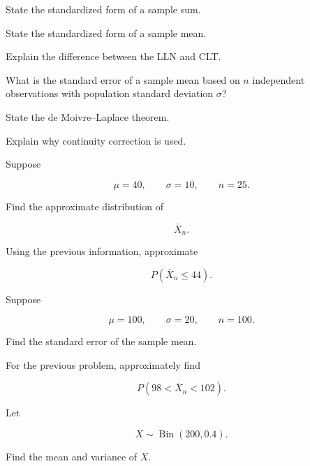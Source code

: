 \begin{exercise}[1]
State the standardized form of a sample sum.
\end{exercise}

\begin{exercise}[1]
State the standardized form of a sample mean.
\end{exercise}

\begin{exercise}[1]
Explain the difference between the LLN and CLT.
\end{exercise}

\begin{exercise}[1]
What is the standard error of a sample mean based on \(n\) independent
observations with population standard deviation \(\sigma\)?
\end{exercise}

\begin{exercise}[1]
State the de Moivre--Laplace theorem.
\end{exercise}

\begin{exercise}[1]
Explain why continuity correction is used.
\end{exercise}

\begin{exercise}[2]
Suppose

\[
\mu=40,
\qquad
\sigma=10,
\qquad
n=25.
\]

Find the approximate distribution of

\[
\overline{X}_n.
\]
\end{exercise}

\begin{exercise}[2]
Using the previous information, approximate

\[
P(\overline{X}_n\leq44).
\]
\end{exercise}

\begin{exercise}[2]
Suppose

\[
\mu=100,
\qquad
\sigma=20,
\qquad
n=100.
\]

Find the standard error of the sample mean.
\end{exercise}

\begin{exercise}[2]
For the previous problem, approximately find

\[
P(98<\overline{X}_n<102).
\]
\end{exercise}

\begin{exercise}[2]
Let

\[
X\sim\operatorname{Bin}(200,0.4).
\]

Find the mean and variance of \(X\).
\end{exercise}

